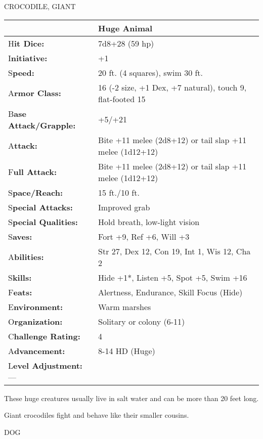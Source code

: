 \documentclass{article}
\begin{document}
\vspace{12pt}
CROCODILE, GIANT

\begin{tabular}{|>{\raggedright}p{91pt}|>{\raggedright}p{233pt}|}
\hline
  & Huge Animal\tabularnewline
\hline
H\textbf{it Dice:} & 7d8+28 (59 hp)\tabularnewline
\hline
I\textbf{nitiative:} & +1\tabularnewline
\hline
S\textbf{peed:} & 20 ft. (4 squares), swim 30 ft.\tabularnewline
\hline
A\textbf{rmor Class:} & 16 (-2 size, +1 Dex, +7 natural), touch 9, flat-footed 
15\tabularnewline
\hline
B\textbf{ase Attack/Grapple:} & +5/+21\tabularnewline
\hline
A\textbf{ttack:} & Bite +11 melee (2d8+12) or tail slap +11 melee (1d12+12)\tabularnewline
\hline
F\textbf{ull Attack:} & Bite +11 melee (2d8+12) or tail slap +11 melee (1d12+12)\tabularnewline
\hline
S\textbf{pace/Reach:} & 15 ft./10 ft.\tabularnewline
\hline
S\textbf{pecial Attacks:} & Improved grab\tabularnewline
\hline
S\textbf{pecial Qualities:} & Hold breath, low-light vision\tabularnewline
\hline
S\textbf{aves:} & Fort +9, Ref +6, Will +3\tabularnewline
\hline
A\textbf{bilities:} & Str 27, Dex 12, Con 19, Int 1, Wis 12, Cha 2\tabularnewline
\hline
S\textbf{kills:} & Hide +1*, Listen +5, Spot +5, Swim +16\tabularnewline
\hline
F\textbf{eats:} & Alertness, Endurance, Skill Focus (Hide)\tabularnewline
\hline
E\textbf{nvironment:} & Warm marshes\tabularnewline
\hline
O\textbf{rganization:} & Solitary or colony (6-11)\tabularnewline
\hline
C\textbf{hallenge Rating:} & 4\tabularnewline
\hline
A\textbf{dvancement:} & 8-14 HD (Huge)\tabularnewline
\hline
L\textbf{evel Adjustment:}--- & \tabularnewline
\hline
\end{tabular}

These huge creatures usually live in salt water and can be more than 20 feet long.

Giant crocodiles fight and behave like their smaller cousins.

\vspace{12pt}
DOG
\end{document}
